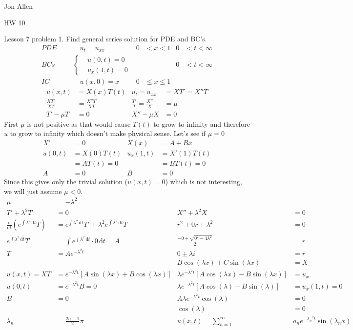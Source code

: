 \documentclass{article}
\begin{document}
Jon Allen

HW 10

Lesson 7 problem 1. Find general series solution for PDE and BC's.
\begin{align*}
  PDE&&&\quad u_t=u_{xx}&0&<x<1&0&<t<\infty\\
  BCs&&&\left\{
  \begin{aligned}
    &u(0,t)=0\\
    &u_x(1,t)=0
  \end{aligned}
  \right.&&&0&<t<\infty\\
  IC&&&\quad u(x,0)=x&0&\leq x\leq 1
\end{align*}
\begin{align*}
  u(x,t)&=X(x)T(t)&u_t=u_{xx}&=XT'=X''T\\
  \frac{XT'}{XT}&=\frac{X''T}{XT}&\frac{T'}{T}=\frac{X''}{X}&=\mu \\
  T'-\mu T&=0&X''-\mu X&=0
\end{align*}
First $\mu $ is not positive as that would cause $T(t)$ to grow to infinity and therefore $u$ to grow to infinity which doesn't make physical sense. Let's see if $\mu =0$
\begin{align*}
  X'&=0&X(x)&=A+Bx\\
  u(0,t)&=X(0)T(t)&u_x(1,t)&=X'(1)T(t)\\
  &=AT(t)=0&&=BT(t)=0\\
  A&=0&B&=0
\end{align*}
Since this gives only the trivial solution ($u(x,t)=0$) which is not interesting, we will just assume $\mu<0$.
\begin{align*}
  \mu&=-\lambda ^2\\
  T'+\lambda ^2T&=0&
  X''+\lambda ^2X&=0\\
  \frac{\mathrm{d}}{\mathrm{d}t}\left(e^{\int{\lambda ^2\,\mathrm{d}t}}T\right)&
  =e^{\int{\lambda ^2\,\mathrm{d}t}}T'+\lambda ^2e^{\int{\lambda ^2\,\mathrm{d}t}}T&
  r^2+0r+\lambda ^2&=0\\
  e^{\int{\lambda ^2\,\mathrm{d}t}}T&
  =\int{e^{\int{\lambda ^2\,\mathrm{d}t}}\cdot 0\,\mathrm{d}t}=A&
  \frac{-0\pm\sqrt{0^2-4\lambda ^2}}{2}&=r\\
  T&=Ae^{-\lambda ^2t}&0\pm\lambda i&=r\\
  &&B\cos(\lambda x)+C\sin(\lambda x)&=X\\
  u(x,t)=XT&=e^{-\lambda ^2t}\left[A\sin(\lambda x)+B\cos(\lambda x)\right]&\lambda e^{-\lambda ^2t}\left[A\cos(\lambda x)-B\sin(\lambda x)\right]&=u_x\\
  u(0,t)&=e^{-\lambda ^2t}B=0
  &\lambda e^{-\lambda ^2t}\left[A\cos(\lambda)-B\sin(\lambda)\right]&=u_x(1,t)=0\\
  B&=0&A\lambda e^{-\lambda ^2t}\cos(\lambda)&=0\\
  &&\cos(\lambda) &=0\\
  \lambda_n&=\frac{2n-1}{2}\pi &
  u(x,t)=\sum\limits_{n=1}^\infty&{a_ne^{-{\lambda_n}^2t}\sin(\lambda_n x)}
\end{align*}
\end{document}
